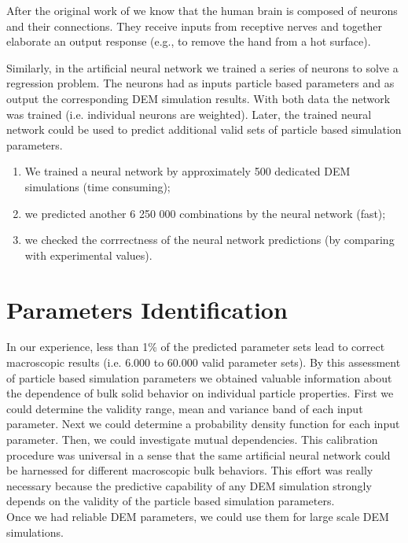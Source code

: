After the original work of \citet{RefWorks:189} we know that the human brain is
composed of neurons and their connections. 
They receive inputs from receptive
nerves and together elaborate an output response (e.g., to remove the hand from
a hot surface).

Similarly, in the artificial neural network we trained a series of neurons to
solve a regression problem.
The neurons had
as inputs particle based parameters and as output the corresponding \acs{DEM}
simulation results.
With both data the network was trained (i.e. individual neurons are
weighted).
Later, the trained neural network could be used to predict additional valid sets
of particle based simulation parameters.

\begin{enumerate}
\item{We trained a neural network by approximately 500 dedicated \acs{DEM} simulations
(time consuming);}
\item{we predicted another 6 250 000 combinations by the neural network
(fast);}
\item{we checked the corrrectness of the neural network predictions (by
comparing with experimental  values).}
\end{enumerate}

\section{Parameters Identification}
\label{sec:parametersidentification}

In our experience, less than 1\% of the predicted parameter sets lead to correct
macroscopic results (i.e. 6.000 to 60.000 valid parameter sets).
By this assessment of particle based simulation parameters we obtained valuable
information about the dependence of bulk solid behavior on individual particle properties.
First we could determine the validity range, mean and variance band of each
input parameter. Next we could determine a probability density function for each
input parameter. Then, we could investigate mutual dependencies.
This calibration procedure was universal in a sense that the same artificial
neural network could be harnessed for different macroscopic bulk behaviors.
This effort was really necessary because the predictive capability of any
\acs{DEM} simulation strongly depends on the validity of the particle 
based simulation parameters.\\
Once we had reliable \acs{DEM} parameters, we could use them for large scale \acs{DEM}
simulations.
